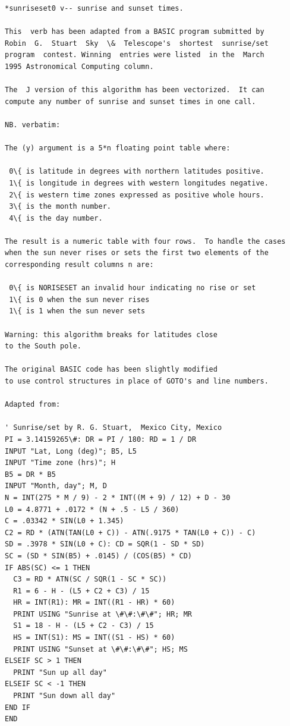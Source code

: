 \documentclass[11pt,letter,landscape]{article}
\begin{document}
    \begin{Verbatim}[commandchars=\\\{\}]
*sunriseset0 v-- sunrise and sunset times.

This  verb has been adapted from a BASIC program submitted by
Robin  G.  Stuart  Sky  \&  Telescope's  shortest  sunrise/set
program  contest. Winning  entries were listed  in the  March
1995 Astronomical Computing column.

The  J version of this algorithm has been vectorized.  It can
compute any number of sunrise and sunset times in one call.

NB. verbatim:

The (y) argument is a 5*n floating point table where:

 0\{ is latitude in degrees with northern latitudes positive.
 1\{ is longitude in degrees with western longitudes negative.
 2\{ is western time zones expressed as positive whole hours.
 3\{ is the month number.
 4\{ is the day number.

The result is a numeric table with four rows.  To handle the cases
when the sun never rises or sets the first two elements of the
corresponding result columns n are:

 0\{ is NORISESET an invalid hour indicating no rise or set
 1\{ is 0 when the sun never rises
 1\{ is 1 when the sun never sets

Warning: this algorithm breaks for latitudes close
to the South pole.

The original BASIC code has been slightly modified
to use control structures in place of GOTO's and line numbers.

Adapted from:

' Sunrise/set by R. G. Stuart,  Mexico City, Mexico
PI = 3.14159265\#: DR = PI / 180: RD = 1 / DR
INPUT "Lat, Long (deg)"; B5, L5
INPUT "Time zone (hrs)"; H
B5 = DR * B5
INPUT "Month, day"; M, D
N = INT(275 * M / 9) - 2 * INT((M + 9) / 12) + D - 30
L0 = 4.8771 + .0172 * (N + .5 - L5 / 360)
C = .03342 * SIN(L0 + 1.345)
C2 = RD * (ATN(TAN(L0 + C)) - ATN(.9175 * TAN(L0 + C)) - C)
SD = .3978 * SIN(L0 + C): CD = SQR(1 - SD * SD)
SC = (SD * SIN(B5) + .0145) / (COS(B5) * CD)
IF ABS(SC) <= 1 THEN
  C3 = RD * ATN(SC / SQR(1 - SC * SC))
  R1 = 6 - H - (L5 + C2 + C3) / 15
  HR = INT(R1): MR = INT((R1 - HR) * 60)
  PRINT USING "Sunrise at \#\#:\#\#"; HR; MR
  S1 = 18 - H - (L5 + C2 - C3) / 15
  HS = INT(S1): MS = INT((S1 - HS) * 60)
  PRINT USING "Sunset at \#\#:\#\#"; HS; MS
ELSEIF SC > 1 THEN
  PRINT "Sun up all day"
ELSEIF SC < -1 THEN
  PRINT "Sun down all day"
END IF
END



\end{Verbatim}
\end{document}
